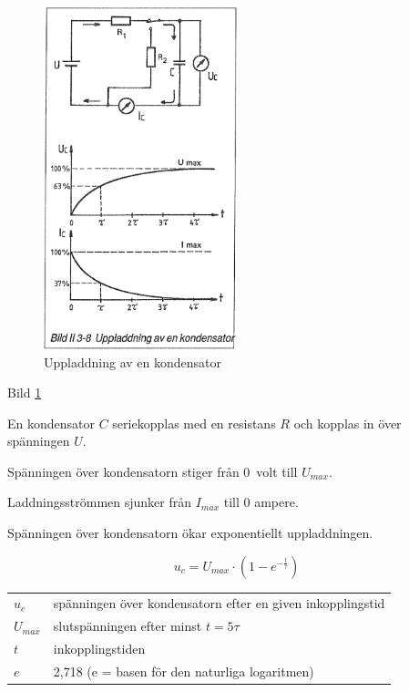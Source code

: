 \begin{figure}
\includegraphics[width=0.5\textwidth]{images/bild_2_3-08}
\caption{Uppladdning av en kondensator}
\label{fig:BildII3-08}
\end{figure}


Bild \ref{fig:BildII3-08}

En kondensator \(C\) seriekopplas med en resistans \(R\)
och kopplas in över spänningen \(U\).

Spänningen över kondensatorn stiger från 0~volt till \(U_{max}\).

Laddningsströmmen sjunker från \(I_{max}\) till 0 ampere.

Spänningen över kondensatorn ökar exponentiellt uppladdningen.

\[u_c = U_{max} \cdot ( 1 - e^{-\frac{t}{\tau}} )\]

\begin{tabular}{lp{}}
  \(u_c\)     & spänningen över kondensatorn efter en given inkopplingstid \\
  \(U_{max}\) & slutspänningen efter minst \(t = 5\tau\) \\
  \(t\)       & inkopplingstiden \\
  \(e\)       & 2,718 (e = basen för den naturliga logaritmen) \\
\end{tabular}

